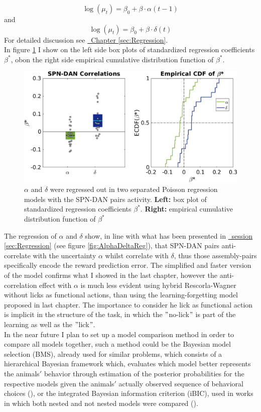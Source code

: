 \begin{equation*}
    \log(\mu_t)=\beta_0+\beta\cdot\alpha(t-1)
\end{equation*}
and 
\begin{equation*}
    \log(\mu_t)=\beta_0+\beta\cdot\delta(t)
\end{equation*}
For detailed discussion see \hyperref[sec:Regression]{~Chapter \ref*{sec:Regression}}.\\
In figure \ref{fig:RL_alphadelta} I show on the left side box plots of standardized regression coefficients $\beta^*$, obon the right side empirical cumulative distribution function of $\beta^*$.\\
\begin{figure}
   \centering
    \includegraphics[scale=0.45]{figures/AlphaAndDeltaPavSPN3.png}
    \caption{$\alpha$ and $\delta$ were regressed out in two separated Poisson regression models with the SPN-DAN pairs activity. \textbf{Left:} box plot of standardized regression coefficients $\beta^*$. \textbf{Right:} empirical cumulative distribution function of $\beta^*$}
    \label{fig:RL_alphadelta}
\end{figure}
The regression of $\alpha$ and $\delta$ show, in line with what has been presented in \hyperref[sec:Regression]{~session \ref*{sec:Regression}} (see figure \ref{fig:AlphaDeltaReg}), that SPN-DAN pairs anti-correlate with the uncertainty $\alpha$ whilst correlate with $\delta$, thus those assembly-pairs specifically encode the reward prediction error. The simplified and faster version of the model confirms what I showed in the last chapter, however the anti-correlation effect with $\alpha$ is much less evident using hybrid Rescorla-Wagner without licks as functional actions, than using the learning-forgetting model proposed in last chapter. The importance to consider he lick as functional action is implicit in the structure of the task, in which the $"$no-lick$"$ is part of the learning as well as the $"$lick$"$.\\In the near future I plan to set up a model comparison method in order to compare all models together, such a method could be the Bayesian model selection (BMS), already used for similar problems, which consists of a hierarchical Bayesian framework which, evaluates which model better represents the animals$'$ behavior through estimation of the posterior probabilities for the respective models given the animals$'$ actually observed sequence of behavioral choices (\cite{Koppe}), or the integrated Bayesian information criterion (iBIC), used in works in which both nested and not nested models were compared (\cite{Dayan}).